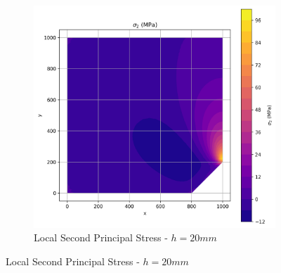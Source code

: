 \begin{figure}[H]
\begin{subfigure}[b]{0.45\textwidth}
    \includegraphics[width=\textwidth]{GRAFICOS/Quad4/2mm_local/resultados - sigma_2.png}
    \caption{Local Second Principal Stress - $h=20mm$}
    \label{fig:img2}
  \end{subfigure}
\end{figure}

